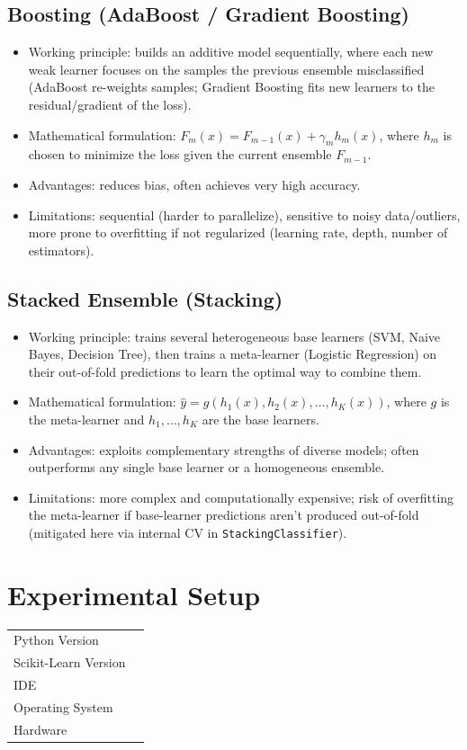 \documentclass[12pt,a4paper]{article}
\begin{document}
\subsection{Boosting (AdaBoost / Gradient Boosting)}
\label{sec:org0f7f5a2}
\begin{itemize}
\item Working principle: builds an additive model sequentially, where each new weak learner focuses on
the samples the previous ensemble misclassified (AdaBoost re-weights samples; Gradient Boosting
fits new learners to the residual/gradient of the loss).
\item Mathematical formulation: \(F_m(x) = F_{m-1}(x) + \gamma_m h_m(x)\), where \(h_m\) is chosen to
minimize the loss given the current ensemble \(F_{m-1}\).
\item Advantages: reduces bias, often achieves very high accuracy.
\item Limitations: sequential (harder to parallelize), sensitive to noisy data/outliers, more prone to
overfitting if not regularized (learning rate, depth, number of estimators).
\end{itemize}

\subsection{Stacked Ensemble (Stacking)}
\label{sec:org3a14c8b}
\begin{itemize}
\item Working principle: trains several heterogeneous base learners (SVM, Naive Bayes, Decision Tree),
then trains a meta-learner (Logistic Regression) on their out-of-fold predictions to learn the
optimal way to combine them.
\item Mathematical formulation: \(\hat{y} = g(h_1(x), h_2(x), \ldots, h_K(x))\), where \(g\) is the
meta-learner and \(h_1, \ldots, h_K\) are the base learners.
\item Advantages: exploits complementary strengths of diverse models; often outperforms any single base
learner or a homogeneous ensemble.
\item Limitations: more complex and computationally expensive; risk of overfitting the meta-learner if
base-learner predictions aren't produced out-of-fold (mitigated here via internal CV in
\texttt{StackingClassifier}).
\end{itemize}

\section{Experimental Setup}
\label{sec:orgbcdb052}
\begin{center}
\begin{tabular}{ll}
Python Version & \\[0pt]
Scikit-Learn Version & \\[0pt]
IDE & \\[0pt]
Operating System & \\[0pt]
Hardware & \\[0pt]
\end{tabular}
\end{center}
\end{document}

